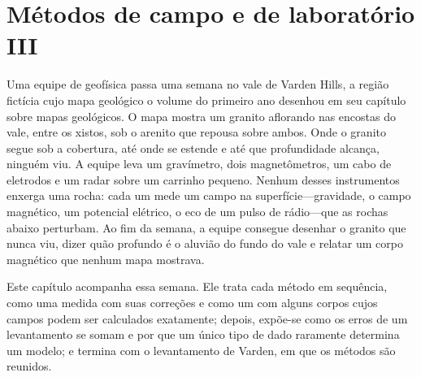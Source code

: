 \chapter{Métodos de campo e de laboratório III}\label{ch:b3:field-lab-methods-3}

Uma equipe de geofísica passa uma semana no vale de Varden Hills, a
região fictícia cujo mapa geológico o volume do primeiro ano desenhou em
seu capítulo sobre mapas geológicos. O mapa mostra um granito aflorando nas
encostas do vale, entre os xistos, sob o arenito que
repousa sobre ambos. Onde o granito segue sob a cobertura, até onde
se estende e até que profundidade alcança, ninguém viu. A equipe leva um
gravímetro, dois magnetômetros, um cabo de eletrodos e um radar sobre um
carrinho pequeno. Nenhum desses instrumentos enxerga uma rocha: cada um mede um
campo na superfície---gravidade, o campo magnético, um
potencial elétrico, o eco de um pulso de rádio---que as rochas abaixo perturbam.
Ao fim da semana, a equipe consegue desenhar o granito que nunca viu, dizer
quão profundo é o aluvião do fundo do vale e relatar um corpo magnético
que nenhum mapa mostrava.

Este capítulo acompanha essa semana. Ele trata cada método em sequência, como
uma medida com suas correções e como um  com alguns corpos cujos
campos podem ser calculados exatamente; depois, expõe-se como os erros de um
levantamento se somam e por que um único tipo de dado raramente determina um
modelo; e termina com o levantamento de Varden, em que os métodos são
reunidos.

